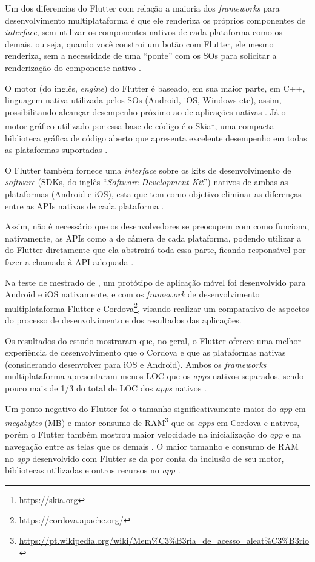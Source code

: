 Um dos diferencias do Flutter com relação a maioria dos \emph{frameworks} para desenvolvimento multiplataforma é que ele renderiza os próprios
componentes de \emph{interface}, sem utilizar os componentes nativos de cada plataforma como os demais, ou seja, quando você constroi um botão com Flutter,
ele mesmo renderiza, sem a necessidade de uma ``ponte'' com os SOs para solicitar a renderização do componente nativo \cite{zammetti2019practical,boukhary2019clean}.

O motor (do inglês, \emph{engine}) do Flutter é baseado, em sua maior parte, em C++, linguagem nativa utilizada pelos SOs (Android, iOS, Windows etc),
assim, possibilitando alcançar desempenho próximo ao de aplicações nativas \cite{zammetti2019practical,kuzmin2020experience}. Já o motor gráfico utilizado
por essa base de código é o Skia\footnote{\url{https://skia.org}}, uma compacta biblioteca gráfica de código aberto que apresenta excelente desempenho
em todas as plataformas suportadas \cite{zammetti2019practical,boukhary2019clean}.

O Flutter também fornece uma \emph{interface} sobre os kits de desenvolvimento de \emph{software} (SDKs, do inglês ``\emph{Software Development Kit}'')
nativos de ambas as plataformas (Android e iOS), esta que tem como objetivo eliminar as diferenças entre as APIs nativas de cada plataforma \cite{zammetti2019practical}.

Assim, não é necessário que os desenvolvedores se preocupem com como funciona, nativamente, as APIs como a de câmera de cada plataforma, podendo utilizar
a do Flutter diretamente que ela abstrairá toda essa parte, ficando responsável por fazer a chamada à API adequada \cite{zammetti2019practical}.

Na teste de mestrado de , um protótipo de aplicação móvel foi desenvolvido para Android e iOS nativamente, e com os
\emph{framework} de desenvolvimento multiplataforma Flutter e Cordova\footnote{\url{https://cordova.apache.org/}}, visando realizar um comparativo de
aspectos do processo de desenvolvimento e dos resultados das aplicações. 

Os resultados do estudo mostraram que, no geral, o Flutter oferece uma melhor experiência de desenvolvimento que o Cordova e que as plataformas nativas
(considerando desenvolver para iOS e Android). Ambos os \emph{frameworks} multiplataforma apresentaram menos LOC que os \emph{apps} nativos separados,
sendo pouco mais de 1/3 do total de LOC dos \emph{apps} nativos \cite{gonsalves2019evaluating}.

Um ponto negativo do Flutter foi o tamanho significativamente maior do \emph{app} em \emph{megabytes} (MB) e maior consumo de RAM\footnote{\url{https://pt.wikipedia.org/wiki/Mem\%C3\%B3ria_de_acesso_aleat\%C3\%B3rio}}
que os \emph{apps} em Cordova e nativos, porém o Flutter também mostrou maior velocidade na inicialização do \emph{app} e na navegação entre as telas
que os demais \cite{gonsalves2019evaluating}. O maior tamanho e consumo de RAM no \emph{app} desenvolvido com Flutter se da por conta da inclusão de seu
motor, bibliotecas utilizadas e outros recursos no \emph{app} \cite{gonsalves2019evaluating,zammetti2019practical}.